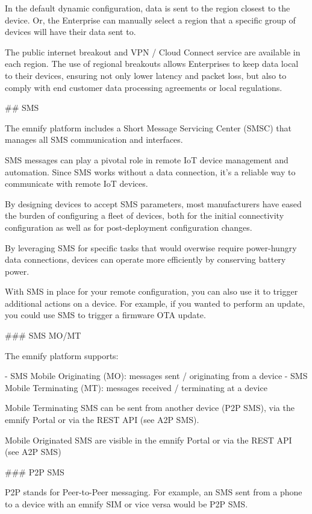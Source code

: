 \documentclass[11pt, oneside]{article}   	%
\begin{document}
\begin{markdown}

In the default dynamic configuration, data is sent to the region closest to the device.
Or, the Enterprise can manually select a region that a specific group of devices will have their data sent to.  

The public internet breakout and VPN / Cloud Connect service are available in each region.
The use of regional breakouts allows Enterprises to keep data local to their devices, ensuring not only lower latency and packet loss, but also to comply with end customer data processing agreements or local regulations. 

## SMS

The emnify platform includes a Short Message Servicing Center (SMSC) that manages all SMS communication and interfaces. 

SMS messages can play a pivotal role in remote IoT device management and automation.
Since SMS works without a data connection, it's a reliable way to communicate with remote IoT devices.

By designing devices to accept SMS parameters, most manufacturers have eased the burden of configuring a fleet of devices, both for the initial connectivity configuration as well as for post-deployment configuration changes.

By leveraging SMS for specific tasks that would overwise require power-hungry data connections, devices can operate more efficiently by conserving battery power.

With SMS in place for your remote configuration, you can also use it to trigger additional actions on a device.
For example, if you wanted to perform an update, you could use SMS to trigger a firmware OTA update.

### SMS MO/MT

The emnify platform supports: 

- SMS Mobile Originating (MO):  messages sent / originating from a device 
- SMS Mobile Terminating (MT): messages received / terminating at a device 

Mobile Terminating SMS can be sent from another device (P2P SMS), via the emnify Portal or via the REST API (see A2P SMS). 

Mobile Originated SMS are visible in the emnify Portal or via the REST API (see A2P SMS)

### P2P SMS

P2P stands for Peer-to-Peer messaging.
For example, an SMS sent from a phone to a device with an emnify SIM or vice versa would be P2P SMS.


\end{markdown}
\end{document}
